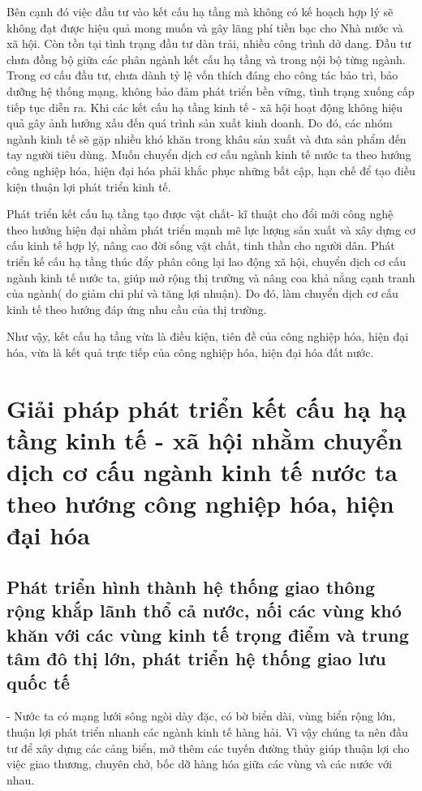 Bên cạnh đó việc đầu tư vào kết cấu hạ tầng mà không có kế hoạch hợp lý sẽ không đạt được hiệu quả mong muốn và gây lãng phí tiền bạc cho Nhà nước và xã hội. Còn tồn tại tình trạng đầu tư dàn trải, nhiều công trình dở dang. Đầu tư chưa đồng bộ giữa các phân ngành kết cấu hạ tầng và trong nội bộ từng ngành. Trong cơ cấu đầu tư, chưa dành tỷ lệ vốn thích đáng cho công tác bảo trì, bảo dưỡng hệ thống mạng, không bảo đảm phát triển bền vững, tình trạng xuống cấp tiếp tục diễn ra. Khi các kết cấu hạ tầng kinh tế - xã hội hoạt động không hiệu quả gây ảnh hưởng xấu đến quá trình sản xuất kinh doanh. Do đó, các nhóm ngành kinh tế sẽ gặp nhiều khó khăn trong khâu sản xuất và đưa sản phẩm đến tay người tiêu dùng. Muốn chuyển dịch cơ cấu ngành kinh tế nước ta theo hướng công nghiệp hóa, hiện đại hóa phải khắc phục những bất cập, hạn chế để tạo điều kiện thuận lợi phát triển kinh tế.

Phát triển kết cấu hạ tầng tạo được vật chất- kĩ thuật cho đổi mới công nghệ theo hưởng hiện đại nhằm phát triển mạnh mẽ lực lượng sản xuất và xây dựng cơ cấu kinh tế hợp lý, nâng cao đời sống vật chất, tinh thần cho người dân. Phát triển kế cấu hạ tầng thúc đẩy phân công lại lao động xã hội, chuyển dịch cơ cấu ngành kinh tế nước ta, giúp mở rộng thị trường và nâng coa khả nẳng cạnh tranh của ngành( do giảm chi phí và tăng lợi nhuận). Do đó, làm chuyển dịch cơ cấu kinh tế theo hướng đáp ứng nhu cầu của thị trường.

Như vậy, kết cấu hạ tầng vừa là điều kiện, tiên đề của công nghiệp hóa, hiện đại hóa, vừa là kết quả trực tiếp của công nghiệp hóa, hiện đại hóa đất nước.

\section[Giải pháp phát triển  kết cấu hạ hạ tầng kinh tế - xã hội]{Giải pháp phát triển  kết cấu hạ hạ tầng kinh tế - xã hội nhằm chuyển dịch cơ cấu ngành kinh tế nước ta theo hướng công nghiệp hóa, hiện đại hóa}

\subsection{Phát triển hình thành hệ thống giao thông rộng khắp lãnh thổ cả nước, nối các vùng khó khăn với các vùng kinh tế trọng điểm và trung tâm đô thị lớn, phát triển hệ thống giao lưu quốc tế}

- Nước ta có mạng lưới sông ngòi dày đặc, có bờ biển dài, vùng biển rộng lớn, thuận lợi phát triển nhanh các ngành kinh tế hàng hải. Vì vậy chúng ta nên đầu tư để xây dựng các cảng biển, mở thêm các tuyến đường thủy giúp thuận lợi cho việc giao thương, chuyên chở, bốc dỡ hàng hóa giữa các vùng và các nước với nhau.

